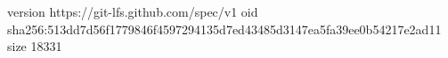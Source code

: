 version https://git-lfs.github.com/spec/v1
oid sha256:513dd7d56f1779846f4597294135d7ed43485d3147ea5fa39ee0b54217e2ad11
size 18331
